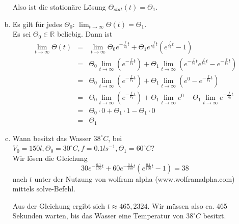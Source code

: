 \documentclass[11pt,a4paper,ngerman]{article}
\begin{document}
\begin{enumerate}[a)]
Also ist die stationäre Lösung $\Theta_{stat}(t) = \Theta_1$.

\item Es gilt für jedes $\Theta_0$: $\lim_{t \to \infty} \Theta(t) = \Theta_1$. \\
Es sei $\Theta_0 \in \mathbb{R}$ beliebig. Dann ist
\begin{eqnarray*}
\lim_{t \to \infty} \Theta(t) &=& \lim_{t \to \infty} \Theta_0 e^{-\frac{f}{V_0} t} + \Theta_1  e^{\frac{-f}{V_0} t} (e^{\frac{f}{V_0} t} - 1) \\
&=& \Theta_0  \lim_{t \to \infty} (e^{-\frac{f}{V_0} t}) + \Theta_1 \lim_{t \to \infty} \left( e^{-\frac{f}{V_0} t}e^{\frac{f}{V_0} t} - e^{-\frac{f}{V_0} t} \right) \\
&=& \Theta_0  \lim_{t \to \infty} (e^{-\frac{f}{V_0} t}) + \Theta_1 \lim_{t \to \infty} \left(e^{0} - e^{-\frac{f}{V_0} t} \right) \\
&=& \Theta_0  \lim_{t \to \infty} (e^{-\frac{f}{V_0} t}) + \Theta_1 \lim_{t \to \infty} e^{0} - \Theta_1 \lim_{t \to \infty} e^{-\frac{f}{V_0} t}\\
&=& \Theta_0 \cdot  0 + \Theta_1 \cdot 1 - \Theta_1 \cdot 0 \\
&=& \Theta_1
\end{eqnarray*}

\item Wann besitzt das Wasser $38 ^\circ C$, bei $V_0 = 150l, \Theta_0 = 30^\circ C, f = 0.1ls^{-1}, \Theta_1 = 60 ^\circ C$? \\

Wir lösen die Gleichung
$$ 
30 e^{-\frac{0.1}{150} t} + 60 e^{-\frac{0.1}{150} t} (e^{\frac{0.1}{150} t} - 1) = 38
$$
nach $t$ unter der Nutzung von wolfram alpha (www.wolframalpha.com) mittels solve-Befehl.

Aus der Gleichung ergibt sich $t \approx 465,2324$. Wir müssen also ca. 465 Sekunden warten, bis das Wasser eine Temperatur von $38 ^\circ C$ besitzt.
\end{enumerate}

\label{LastPage}
\end{document}
